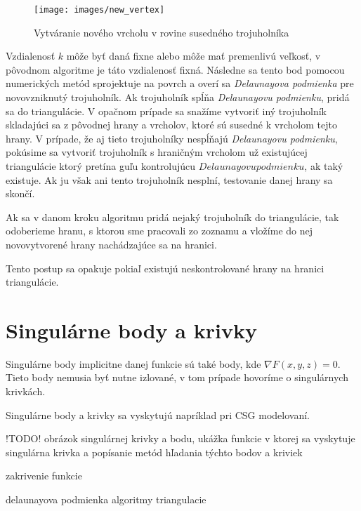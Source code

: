 \begin{figure}
    \centerline{\texttt{[image: images/new\_vertex]}}
    \caption[Vytváranie nového vrcholu $V$ v rovine susedného trojuholníka]{Vytváranie nového vrcholu v rovine susedného trojuholníka}
    \label{obr:new_vertex}
\end{figure}

Vzdialenosť $k$ môže byť daná fixne alebo môže mať premenlivú veľkosť, v pôvodnom algoritme je táto vzdialenosť fixná. 
Následne sa tento bod pomocou numerických metód sprojektuje na povrch a overí sa \textit{Delaunayova podmienka} pre novovzniknutý 
trojuholník. 
Ak trojuholník spĺňa \textit{Delaunayovu podmienku}, pridá sa do triangulácie. V opačnom prípade sa snažíme vytvoriť iný trojuholník 
skladajúci sa z pôvodnej hrany a vrcholov, ktoré sú susedné k vrcholom tejto hrany. V prípade, že aj tieto trojuholníky nespĺňajú 
\textit{Delaunayovu podmienku}, pokúsime sa vytvoriť trojuholník s hraničným vrcholom už existujúcej triangulácie ktorý pretína
guľu kontrolujúcu $Delaunayovu podmienku$, ak taký existuje. Ak ju však ani tento trojuholník nesplní, testovanie danej hrany sa skončí.

Ak sa v danom kroku algoritmu pridá nejaký trojuholník do triangulácie, tak odoberieme hranu, s ktorou sme pracovali zo zoznamu a 
vložíme do nej novovytvorené hrany nachádzajúce sa na hranici.

Tento postup sa opakuje pokiaľ existujú neskontrolované hrany na hranici triangulácie.

\newpage

\section{Singulárne body a krivky}

Singulárne body implicitne danej funkcie sú také body, kde $\nabla F(x, y, z) = 0$. Tieto body nemusia byť nutne izlované, 
v tom prípade hovoríme o singulárnych krivkách. 

Singulárne body a krivky sa vyskytujú napríklad pri CSG modelovaní.

\medskip

!TODO! obrázok singulárnej krivky a bodu, ukážka funkcie v ktorej sa vyskytuje singulárna 
krivka a popísanie metód hľadania týchto bodov a kriviek

\medskip

zakrivenie funkcie



delaunayova podmienka
algoritmy triangulacie






